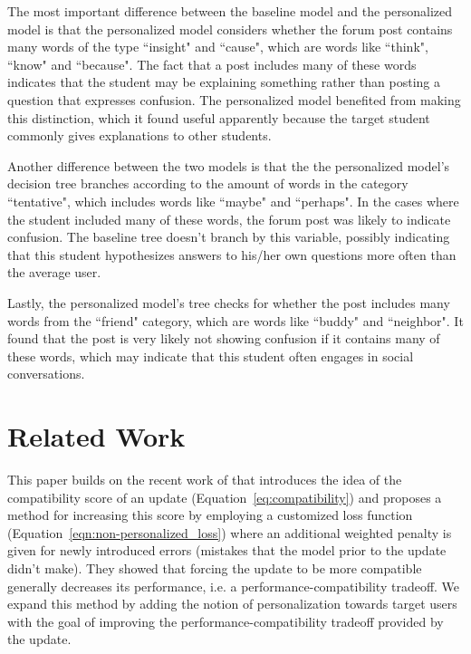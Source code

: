 \documentclass[letterpaper]{article} %
\theoremstyle{definition}
\begin{document}
The most important difference between the baseline model and the personalized model is that the personalized model considers whether the forum post contains many words of the type ``insight" and ``cause", which are words like ``think", ``know" and ``because".
The fact that a post includes many of these words indicates that the student may be explaining something rather than posting a question that expresses confusion. 
The personalized model benefited from making this distinction, which it found useful apparently because the target student commonly gives explanations to other students.

Another difference between the two models is that the  the personalized model's decision tree branches according to the amount of words in the category ``tentative", which includes words like ``maybe" and ``perhaps". In the cases where the student included many of these words, the forum post was likely to indicate confusion.
The baseline tree doesn't branch by this variable, possibly indicating that this student hypothesizes answers to his/her own questions more often than the average user.

Lastly, the personalized model's tree checks for whether the post includes many words from the ``friend" category, which are words like ``buddy" and ``neighbor". It found that the post is very likely not showing confusion if it contains many of these words, which may indicate that this student often engages in social conversations. 
%
\section{Related Work}

This paper builds on the recent work of \citet{bansal2019updates} that introduces the idea of the compatibility score of an update (Equation~\ref{eq:compatibility}) and proposes a method for increasing this score by employing a customized loss function (Equation~\ref{eqn:non-personalized_loss}) where an additional weighted penalty is given for newly introduced errors (mistakes that the model prior to the update didn't make). They showed that forcing the update to be more compatible generally decreases its performance, i.e. a performance-compatibility tradeoff. We expand this method by adding the notion of personalization towards target users with the goal of improving the performance-compatibility tradeoff provided by the update. %
\end{document}

